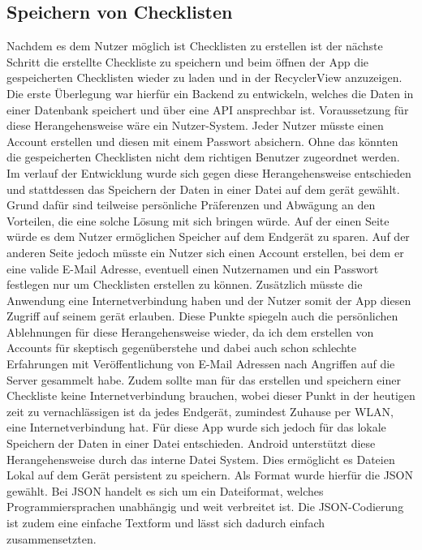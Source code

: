 \subsection{Speichern von Checklisten}\label{subsec:speichereCheckliste}

Nachdem es dem Nutzer möglich ist Checklisten zu erstellen ist der nächste Schritt die erstellte Checkliste zu speichern und beim öffnen der App die gespeicherten Checklisten wieder zu laden und in der RecyclerView anzuzeigen.\\
Die erste Überlegung war hierfür ein Backend zu entwickeln, welches die Daten in einer Datenbank speichert und über eine \ac{API} ansprechbar ist. Voraussetzung für diese Herangehensweise wäre ein Nutzer-System. Jeder Nutzer müsste einen Account erstellen und diesen mit einem Passwort absichern. Ohne das könnten die gespeicherten Checklisten nicht dem richtigen Benutzer zugeordnet werden. Im verlauf der Entwicklung wurde sich gegen diese Herangehensweise entschieden und stattdessen das Speichern der Daten in einer Datei auf dem gerät gewählt. Grund dafür sind teilweise persönliche Präferenzen und Abwägung an den Vorteilen, die eine solche Lösung mit sich bringen würde. Auf der einen Seite würde es dem Nutzer ermöglichen Speicher auf dem Endgerät zu sparen. Auf der anderen Seite jedoch müsste ein Nutzer sich einen Account erstellen, bei dem er eine valide E-Mail Adresse, eventuell einen Nutzernamen und ein Passwort festlegen nur um Checklisten erstellen zu können. Zusätzlich müsste die Anwendung eine Internetverbindung haben und der Nutzer somit der App diesen Zugriff auf seinem gerät erlauben. Diese Punkte spiegeln auch die persönlichen Ablehnungen für diese Herangehensweise wieder, da ich dem erstellen von Accounts für skeptisch gegenüberstehe und dabei auch schon schlechte Erfahrungen mit Veröffentlichung von E-Mail Adressen nach Angriffen auf die Server gesammelt habe. Zudem sollte man für das erstellen und speichern einer Checkliste keine Internetverbindung brauchen, wobei dieser Punkt in der heutigen zeit zu vernachlässigen ist da jedes Endgerät, zumindest Zuhause per WLAN, eine Internetverbindung hat. Für diese App wurde sich jedoch für das lokale Speichern der Daten in einer Datei entschieden. Android unterstützt diese Herangehensweise durch das interne Datei System. Dies ermöglicht es Dateien Lokal auf dem Gerät persistent zu speichern. Als Format wurde hierfür die \ac{JSON} gewählt. Bei \ac{JSON} handelt es sich um ein Dateiformat, welches Programmiersprachen unabhängig und weit verbreitet ist. Die \ac{JSON}-Codierung ist zudem eine einfache Textform und lässt sich dadurch einfach zusammensetzten.\\
